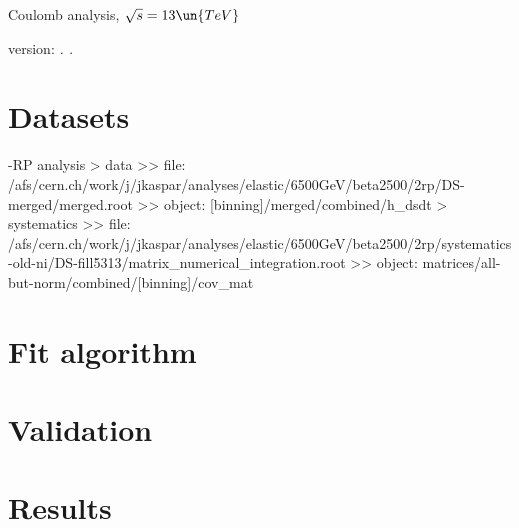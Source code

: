 

\def\baseDir{/afs/cern.ch/work/j/jkaspar/analyses/elastic/6500GeV/combined/coulomb_analysis_1}


\hbox{}
\vskip-10mm

\centerline{\SetFontSizesXX Coulomb analysis, $\sqrt s = 13\un{TeV}$}
\vskip2mm
\centerline{version: {\it \number\day. \number\month. \number\year}}

\vfil
\InsertToc

\vfil
\eject

\BeginText

\chapter[datasets]{Datasets}

-RP analysis
\>> data
\>>> file: /afs/cern.ch/work/j/jkaspar/analyses/elastic/6500GeV/beta2500/2rp/DS-merged/merged.root
\>>> object: [binning]/merged/combined/h\_dsdt
\>> systematics
\>>> file: /afs/cern.ch/work/j/jkaspar/analyses/elastic/6500GeV/beta2500/2rp/systematics-old-ni/DS-fill5313/matrix\_numerical\_integration.root
\>>> object: matrices/all-but-norm/combined/[binning]/cov\_mat


\chapter{Fit algorithm}


\chapter{Validation}


\chapter{Results}



\EndText
\bye

